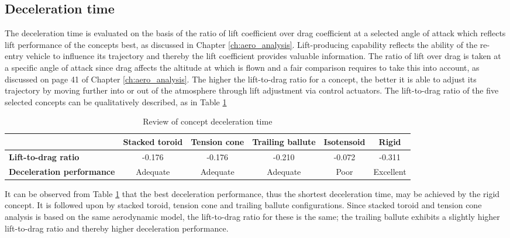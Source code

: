 \subsection{Deceleration time}
The deceleration time is evaluated on the basis of the ratio of lift coefficient over drag coefficient at a selected angle of attack which reflects lift performance of the concepts best, as discussed in Chapter \ref{ch:aero_analysis}. Lift-producing capability reflects the ability of the re-entry vehicle to influence its trajectory and thereby the lift coefficient provides valuable information. The ratio of lift over drag is taken at a specific angle of attack since drag affects the altitude at which is flown and a fair comparison requires to take this into account, as discussed on page 41 of Chapter \ref{ch:aero_analysis}. The higher the lift-to-drag ratio for a concept, the better it is able to adjust its trajectory by moving further into or out of the atmosphere through lift adjustment via control actuators. The lift-to-drag ratio of the five selected concepts can be qualitatively described, as in Table \ref{tab:decel}

\begin{table}[h]
\caption{Review of concept deceleration time}
\hspace{-10mm}
\begin{tabular}{|p{2.5cm}|c|c|c|c|c|}
\hline
\textbf{}                          & \textbf{Stacked toroid} & \textbf{Tension cone} & \textbf{Trailing ballute} & \textbf{Isotensoid} & \textbf{Rigid} \\ \hline
\textbf{Lift-to-drag ratio} & \cellcolor{yellow!75} -0.176  &\cellcolor{yellow!75} -0.176   &\cellcolor{yellow!75} -0.210 & \cellcolor{red!60} -0.072 &\cellcolor{green!70} -0.311              \\ \hline
\textbf{Deceleration performance} &\cellcolor{yellow!75} Adequate &\cellcolor{yellow!75}  Adequate  &\cellcolor{yellow!75} Adequate & \cellcolor{red!60}     Poor       &\cellcolor{green!70} Excellent                 \\ \hline
\end{tabular}
\label{tab:decel}
\end{table}

It can be observed from Table \ref{tab:decel} that the best deceleration performance, thus the shortest deceleration time, may be achieved by the rigid concept. It is followed upon by stacked toroid, tension cone and trailing ballute configurations. Since stacked toroid and tension cone analysis is based on the same aerodynamic model, the lift-to-drag ratio for these is the same; the trailing ballute exhibits a slightly higher lift-to-drag ratio and thereby higher deceleration performance.

